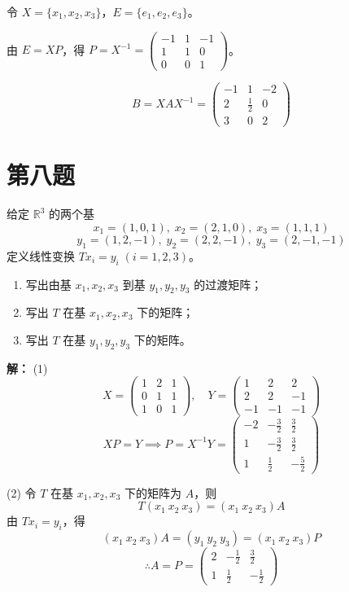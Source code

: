 \documentclass{article}
\begin{document}
令 \( X = \{x_1, x_2, x_3\} \)，\( E = \{e_1, e_2, e_3\} \)。

由 \( E = XP \)，得 \( P = X^{-1} = \begin{pmatrix}
-1 & 1 & -1 \\
1 & 1 & 0 \\
0 & 0 & 1
\end{pmatrix} \)。

\[
B = XAX^{-1} = \begin{pmatrix}
-1 & 1 & -2 \\
2 & \frac{1}{2} & 0 \\
3 & 0 & 2
\end{pmatrix}
\]

\newpage
\section{第八题}\noindent
给定 $\mathbb{R}^3$ 的两个基
\[
x_1 = (1,0,1),\; x_2 = (2,1,0),\; x_3 = (1,1,1)
\]
\[
y_1 = (1,2,-1),\; y_2 = (2,2,-1),\; y_3 = (2,-1,-1)
\]
定义线性变换 $T x_i = y_i\;(i=1,2,3)$。
\begin{enumerate}
\item 写出由基 $x_1,x_2,x_3$ 到基 $y_1,y_2,y_3$ 的过渡矩阵；
\item 写出 $T$ 在基 $x_1,x_2,x_3$ 下的矩阵；
\item 写出 $T$ 在基 $y_1,y_2,y_3$ 下的矩阵。
\end{enumerate}
\textbf{解：}
(1)
\[
X = \begin{pmatrix}
1 & 2 & 1 \\
0 & 1 & 1 \\
1 & 0 & 1
\end{pmatrix}, \quad
Y = \begin{pmatrix}
1 & 2 & 2 \\
2 & 2 & -1 \\
-1 & -1 & -1
\end{pmatrix}
\]
\[
XP = Y \implies P = X^{-1}Y = \begin{pmatrix}
-2 & -\frac{3}{2} & \frac{3}{2} \\
1 & -\frac{3}{2} & \frac{3}{2} \\
1 & \frac{1}{2} & -\frac{5}{2}
\end{pmatrix}
\]

(2) 令 \( T \) 在基 \( x_1,x_2,x_3 \) 下的矩阵为 \( A \)，则
\[
T(x_1\ x_2\ x_3) = (x_1\ x_2\ x_3)A
\]
由 \( T x_i = y_i \)，得
\[
(x_1\ x_2\ x_3)A = (y_1\ y_2\ y_3) = (x_1\ x_2\ x_3)P
\]
\[
\therefore A = P = \begin{pmatrix}
2 & -\frac{1}{2} & \frac{3}{2} \\
1 & \frac{1}{2} & -\frac{1}{2}
\end{pmatrix}
\]
\end{document}
